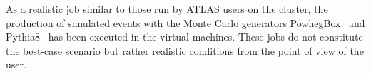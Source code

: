 As a realistic job similar to those run by ATLAS users on the \NEMO
cluster, the production of simulated events with the Monte Carlo
generators PowhegBox~\cite{PowhegBox} and Pythia8~\cite{Pythia8} has been executed in the virtual
machines.
These jobs do not constitute the best-case scenario but rather
realistic conditions from the point of view of the user.
